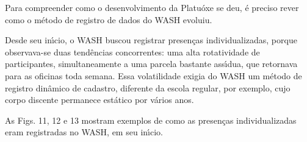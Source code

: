 \documentclass[
12pt,		%
openright,	%
twoside,  %
a4paper,			%
chapter=TITLE,		%
english,			%
french,				%
spanish,			%
brazil				%
]{USPSC-classe/USPSC}
\begin{document}
Para compreender como o desenvolvimento da Platu\'oxe se deu, \'e preciso rever como o m\'etodo de registro de dados do WASH evoluiu.









Desde seu in\'{\i}cio, o WASH buscou registrar presen\c{c}as individualizadas, porque observava-se duas tend\^encias concorrentes: uma alta rotatividade de participantes, simultaneamente a uma parcela bastante ass\'{\i}dua, que retornava para as oficinas toda semana. Essa volatilidade exigia do WASH um m\'etodo de registro din\^amico de cadastro, diferente da escola regular, por exemplo, cujo corpo discente  permanece est\'atico por v\'arios anos.









As Figs. 11, 12 e 13 mostram exemplos de como as presen\c{c}as individualizadas eram registradas no WASH, em seu in\'{\i}cio.
\end{document}
